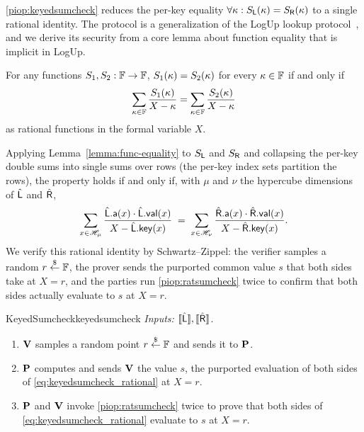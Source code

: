 \cref{piop:keyedsumcheck} reduces the per-key equality $\forall \kappa : S_{\mathsf{L}}(\kappa) = S_{\mathsf{R}}(\kappa)$ to a single rational identity. The protocol is a generalization of the LogUp lookup protocol~\cite{Habock22}, and we derive its security from a core lemma about function equality that is implicit in LogUp.
\begin{ilemma}
    \label{lemma:func-equality}
    For any functions $S_1, S_2: \mathbb{F} \to \mathbb{F}$, $S_1(\kappa) = S_2(\kappa)$ for every $\kappa \in \mathbb{F}$ if and only if
    \begin{displaymath}
        \sum_{\kappa \in \mathbb{F}} \frac{S_1(\kappa)}{X - \kappa} = \sum_{\kappa \in \mathbb{F}} \frac{S_2(\kappa)}{X - \kappa}
    \end{displaymath}
    as rational functions in the formal variable $X$.
\end{ilemma}
Applying Lemma~\ref{lemma:func-equality} to $S_{\mathsf{L}}$ and $S_{\mathsf{R}}$ and collapsing the per-key double sums into single sums over rows (the per-key index sets partition the rows), the property holds if and only if, with $\mu$ and $\nu$ the hypercube dimensions of $\hat{\mathsf{L}}$ and $\hat{\mathsf{R}}$,
\begin{equation}
    \label{eq:keyedsumcheck_rational}
    \sum_{x \in \mathscr{H}_{\mu}} \frac{\hat{\mathsf{L}}.\mathsf{a}(x) \cdot \hat{\mathsf{L}}.\mathsf{val}(x)}{X - \hat{\mathsf{L}}.\mathsf{key}(x)}
    \;=\;
    \sum_{x \in \mathscr{H}_{\nu}} \frac{\hat{\mathsf{R}}.\mathsf{a}(x) \cdot \hat{\mathsf{R}}.\mathsf{val}(x)}{X - \hat{\mathsf{R}}.\mathsf{key}(x)}.
\end{equation}
We verify this rational identity by Schwartz--Zippel: the verifier samples a random $r \overset{\$}{\leftarrow} \mathbb{F}$, the prover sends the purported common value $s$ that both sides take at $X = r$, and the parties run \cref{piop:ratsumcheck} twice to confirm that both sides actually evaluate to $s$ at $X = r$.
\begin{DefinePIOP}{KeyedSumcheck}{keyedsumcheck}
  \emph{Inputs:} $\llbracket\hat{\mathsf{L}}\rrbracket, \llbracket\hat{\mathsf{R}}\rrbracket$.
    \begin{enumerate}[nosep]
        \item $\bf{V}$ samples a random point $r \overset{\$}{\leftarrow} \mathbb{F}$ and sends it to $\bf{P}$.
        \item $\bf{P}$ computes and sends $\bf{V}$ the value $s$, the purported evaluation of both sides of \cref{eq:keyedsumcheck_rational} at $X = r$.
        \item $\bf{P}$ and $\bf{V}$ invoke \cref{piop:ratsumcheck} twice to prove that both sides of \cref{eq:keyedsumcheck_rational} evaluate to $s$ at $X = r$.
    \end{enumerate}
\end{DefinePIOP}


